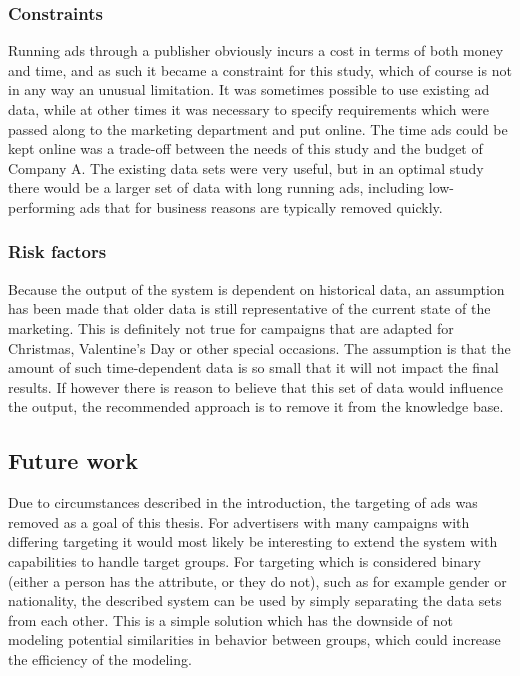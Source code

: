 \documentclass{sig-alternate}
\begin{document}
\subsubsection{Constraints}
Running ads through a publisher obviously incurs a cost in terms of both money and time, and as such it became a constraint for this study, which of course is not in any way an unusual limitation. It was sometimes possible to use existing ad data, while at other times it was necessary to specify requirements which were passed along to the marketing department and put online. The time ads could be kept online was a trade-off between the needs of this study and the budget of Company A. The existing data sets were very useful, but in an optimal study there would be a larger set of data with long running ads, including low-performing ads that for business reasons are typically removed quickly.

\subsubsection{Risk factors}
Because the output of the system is dependent on historical data, an assumption has been made that older data is still representative of the current state of the marketing. This is definitely not true for campaigns that are adapted for Christmas, Valentine's Day or other special occasions. The assumption is that the amount of such time-dependent data is so small that it will not impact the final results. If however there is reason to believe that this set of data would influence the output, the recommended approach is to remove it from the knowledge base.

\subsection{Future work}
Due to circumstances described in the introduction, the targeting of ads was removed as a goal of this thesis. For advertisers with many campaigns with differing targeting it would most likely be interesting to extend the system with capabilities to handle target groups. For targeting which is considered binary (either a person has the attribute, or they do not), such as for example gender or nationality, the described system can be used by simply separating the data sets from each other. This is a simple solution which has the downside of not modeling potential similarities in behavior between groups, which could increase the efficiency of the modeling.
\end{document}
